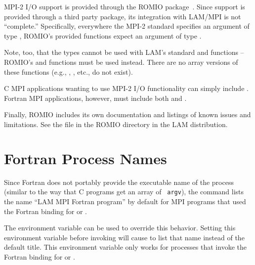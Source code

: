 MPI-2 I/O support is provided through the ROMIO
package~\cite{thak99a,thak99b}.  Since support is provided through a
third party package, its integration with LAM/MPI is not ``complete.''
Specifically, everywhere the MPI-2 standard specifies an argument of
type , ROMIO's provided functions expect an
argument of type .

Note, too, that the  types cannot be used
with LAM's standard  and 
functions -- ROMIO's  and 
functions must be used instead.  There are no array versions of these
functions (e.g., , ,
etc., do not exist).

C MPI applications wanting to use MPI-2 I/O functionality can simply
include .  Fortran MPI applications, however, must include
both  and .

Finally, ROMIO includes its own documentation and listings of known
issues and limitations.  See the  file in the ROMIO
directory in the LAM distribution.


\section{Fortran Process Names}

Since Fortran does not portably provide the executable name of the
process (similar to the way that C programs get an array of {\tt
  argv}), the  command lists the name ``LAM MPI Fortran
program'' by default for MPI programs that used the Fortran binding
for  or .

The environment variable  can
be used to override this behavior.
%
Setting this environment variable before invoking  will
cause  to list that name instead of the default title.
%
This environment variable only works for processes that invoke the
Fortran binding for  or
.


